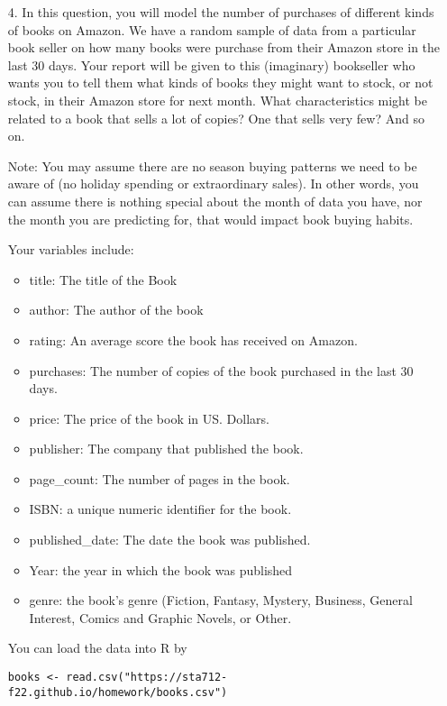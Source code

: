 \documentclass[11pt]{article}
\begin{document}
\begin{enumerate}
\item[4.] In this question, you will model the number of purchases of different kinds of books on Amazon. We have a random sample of data from a particular book seller on how many books were purchase from their Amazon store in the last 30 days. Your report will be given to this (imaginary) bookseller who wants you to tell them what kinds of books they might want to stock, or not stock, in their Amazon store for next month. What characteristics might be related to a book that sells a lot of copies? One that sells very few? And so on.

Note: You may assume there are no season buying patterns we need to be aware of (no holiday spending or extraordinary sales). In other words, you can assume there is nothing special about the month of data you have, nor the month you are predicting for, that would impact book buying habits.

Your variables include:
\begin{itemize}
\item title: The title of the Book
\item author: The author of the book
\item rating: An average score the book has received on Amazon.
\item purchases: The number of copies of the book purchased in the last 30 days.
\item price: The price of the book in US. Dollars.
\item publisher: The company that published the book.
\item page\_count: The number of pages in the book.
\item ISBN: a unique numeric identifier for the book.
\item published\_date: The date the book was published.
\item Year: the year in which the book was published
\item genre: the book's genre (Fiction, Fantasy, Mystery, Business, General Interest, Comics and Graphic Novels, or Other.
\end{itemize}

You can load the data into R by
\begin{verbatim}
books <- read.csv("https://sta712-f22.github.io/homework/books.csv")
\end{verbatim}

\begin{enumerate}


\end{enumerate}
\end{enumerate}
\end{document}
